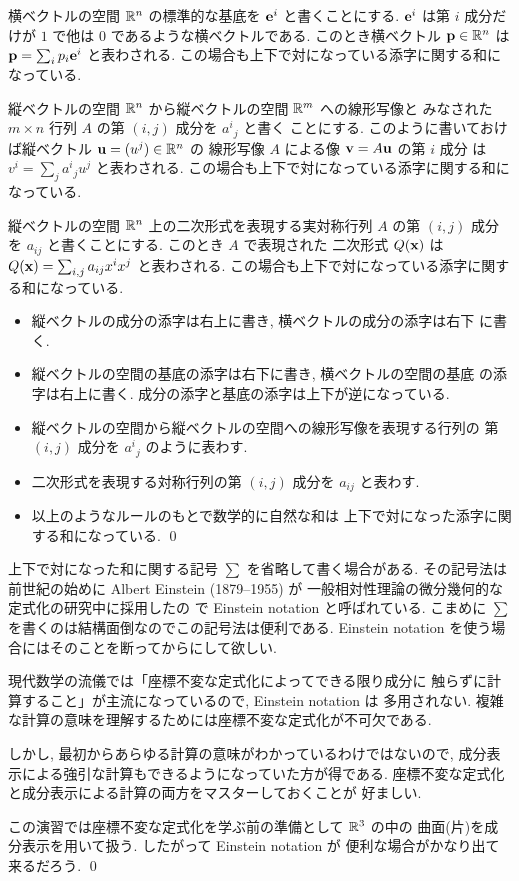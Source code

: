 \documentclass[12pt,twoside]{jarticle}
\begin{document}
横ベクトルの空間 ${\mathbb R}^n$ の標準的な基底を ${\mathbf e}^i$ と書くことにする.
${\mathbf e}^i$ は第 $i$ 成分だけが $1$ で他は $0$ であるような横ベクトルである.
このとき横ベクトル ${\mathbf p}\in{\mathbb R}^n$ は ${\mathbf p}=\sum_i p_i{\mathbf e}^i$ と表わされる.
この場合も上下で対になっている添字に関する和になっている.

縦ベクトルの空間 ${\mathbb R}^n$ から縦ベクトルの空間 ${\mathbb R}^m$ への線形写像と
みなされた $m\times n$ 行列 $A$ の第 $(i,j)$ 成分を $a^i{}_j$ と書く
ことにする. このように書いておけば縦ベクトル ${\mathbf u}=(u^j)\in{\mathbb R}^n$ の
線形写像 $A$ による像 ${\mathbf v}=A{\mathbf u}$ の第 $i$ 成分
は $v^i=\sum_j a^i{}_ju^j$ と表わされる. 
この場合も上下で対になっている添字に関する和になっている.

縦ベクトルの空間 ${\mathbb R}^n$ 上の二次形式を表現する実対称行列 $A$ 
の第 $(i,j)$ 成分を $a_{ij}$ と書くことにする. このとき $A$ で表現された
二次形式 $Q({\mathbf x})$ は $Q({\mathbf x}) = \sum_{i,j} a_{ij}x^ix^j$ と表わされる.
この場合も上下で対になっている添字に関する和になっている.

\begin{summary}[添字の付け方の基本原則]\quad
\begin{itemize}
 \item 縦ベクトルの成分の添字は右上に書き, 横ベクトルの成分の添字は右下
       に書く.
 \item 縦ベクトルの空間の基底の添字は右下に書き, 横ベクトルの空間の基底
       の添字は右上に書く. 成分の添字と基底の添字は上下が逆になっている.
 \item 縦ベクトルの空間から縦ベクトルの空間への線形写像を表現する行列の
       第 $(i,j)$ 成分を $a^i{}_j$ のように表わす.
 \item 二次形式を表現する対称行列の第 $(i,j)$ 成分を $a_{ij}$ と表わす.
 \item 以上のようなルールのもとで数学的に自然な和は
       上下で対になった添字に関する和になっている.
 \qed 
\end{itemize}
\end{summary}

\begin{guide}
 上下で対になった和に関する記号 $\sum$ を省略して書く場合がある.
 その記号法は前世紀の始めに Albert Einstein (1879--1955) が
 一般相対性理論の微分幾何的な定式化の研究中に採用したの
 で Einstein notation と呼ばれている.
 こまめに $\sum$ を書くのは結構面倒なのでこの記号法は便利である.
 Einstein notation を使う場合にはそのことを断ってからにして欲しい.

 現代数学の流儀では「座標不変な定式化によってできる限り成分に
 触らずに計算すること」が主流になっているので, Einstein notation は
 多用されない. 
 複雑な計算の意味を理解するためには座標不変な定式化が不可欠である. 

 しかし, 最初からあらゆる計算の意味がわかっているわけではないので,
 成分表示による強引な計算もできるようになっていた方が得である.
 座標不変な定式化と成分表示による計算の両方をマスターしておくことが
 好ましい. 

 この演習では座標不変な定式化を学ぶ前の準備として ${\mathbb R}^3$ の中の
 曲面(片)を成分表示を用いて扱う.  したがって Einstein notation が
 便利な場合がかなり出て来るだろう.
 \qed
\end{guide}
\end{document}
